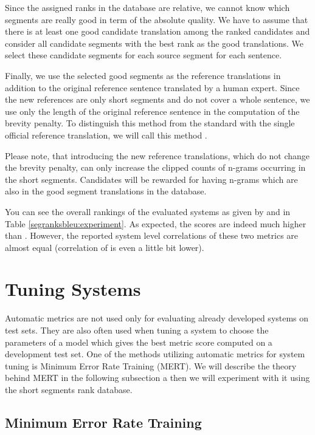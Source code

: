 Since the assigned ranks in the database are relative, we cannot know which
segments are really good in term of the absolute quality. We have to assume
that there is at least one good candidate translation among the ranked
candidates and consider all candidate segments with the best rank as the good
translations. We select these candidate segments for each source segment for
each sentence.

Finally, we use the selected good segments as the reference translations in
addition to the original reference sentence translated by a human expert.  Since
the new references are only short segments and do not cover a whole sentence,
we use only the length of the original reference sentence in the computation of
the brevity penalty. To distinguish this method from the standard 
with the single official reference translation, we will call this method
.

Please note, that introducing the new reference
translations, which do not change the brevity penalty, can only increase the
clipped counts of n-grams occurring in the short segments.  Candidates will be
rewarded for having n-grams which are also in the good segment translations in
the database.

You can see the overall rankings of the evaluated systems as given by
 and  in Table
\ref{segranksbleu:experiment}. As expected, the  scores
are indeed much higher than . However, the reported system level
correlations of these two metrics are almost equal (correlation of
 is even a little bit lower).


\section{Tuning Systems}
\label{tuning-systems}

Automatic metrics are not used only for evaluating already developed systems on
test sets. They are also often used when tuning a system to choose the
parameters of a model which gives the best metric score computed on a
development test set. One of the methods utilizing automatic metrics for system
tuning is Minimum Error Rate Training (MERT). We will describe the theory
behind MERT in the following subsection a then we will experiment with it using
the short segments rank database.

\subsection{Minimum Error Rate Training}

